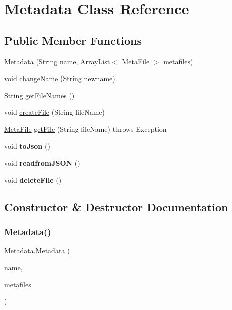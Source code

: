 \hypertarget{class_metadata}{}\section{Metadata Class Reference}
\label{class_metadata}
\subsection*{Public Member Functions}
\begin{DoxyCompactItemize}
\item 
\mbox{\hyperlink{class_metadata_a5d0290e9e1427f229a976d921da5423b}{Metadata}} (String name, Array\+List$<$ \mbox{\hyperlink{class_meta_file}{Meta\+File}} $>$ metafiles)
\item 
void \mbox{\hyperlink{class_metadata_ad82a2024da7159b62b4baaf431c986e6}{change\+Name}} (String newname)
\item 
String \mbox{\hyperlink{class_metadata_a47932985a21ca5fe3e99726b50c36658}{get\+File\+Names}} ()
\item 
void \mbox{\hyperlink{class_metadata_a67800e2f003cabb15744b86bec38a783}{create\+File}} (String file\+Name)
\item 
\mbox{\hyperlink{class_meta_file}{Meta\+File}} \mbox{\hyperlink{class_metadata_ae29cb4e7e73fdda5a3649e085863d481}{get\+File}} (String file\+Name)  throws Exception 	
\item 
\mbox{\label{class_metadata_ad553fd3bd0610354c55d603c64886533}} 
void {\bfseries to\+Json} ()
\item 
\mbox{\label{class_metadata_ab22a1ff2f8390792d6c520be50dd3906}} 
void {\bfseries readfrom\+J\+S\+ON} ()
\item 
\mbox{\label{class_metadata_a8176cc867722d5a71d2a17ba574d61bc}} 
void {\bfseries delete\+File} ()
\end{DoxyCompactItemize}


\subsection{Constructor \& Destructor Documentation}
\mbox{\label{class_metadata_a5d0290e9e1427f229a976d921da5423b}} 
\subsubsection{\texorpdfstring{Metadata()}{Metadata()}}
{\footnotesize\ttfamily Metadata.\+Metadata (\begin{DoxyParamCaption}\item[{String}]{name,  }\item[{Array\+List$<$ \mbox{\hyperlink{class_meta_file}{Meta\+File}} $>$}]{metafiles }\end{DoxyParamCaption})\hspace{0.3cm}{\ttfamily [inline]}}

